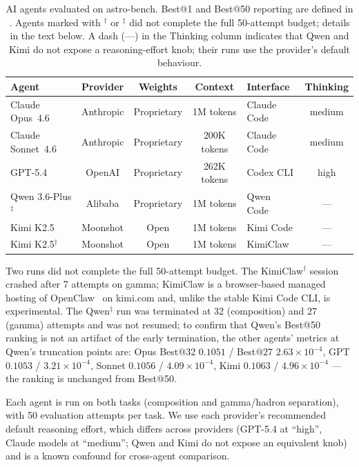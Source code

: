 \documentclass[universe,article,submit,pdftex,oneauthor]{Definitions/mdpi}
\begin{document}
\begin{table}[H]
\caption{AI agents evaluated on astro-bench. Best@1 and Best@50 reporting are defined in . Agents marked with $^\dagger$ or $^\ddagger$ did not complete the full 50-attempt budget; details in the text below. A dash (---) in the Thinking column indicates that Qwen and Kimi do not expose a reasoning-effort knob; their runs use the provider's default behaviour.\label{tab:agents}}
\begin{tabularx}{\textwidth}{lCCClC}
\toprule
\textbf{Agent} & \textbf{Provider} & \textbf{Weights} & \textbf{Context} & \textbf{Interface} & \textbf{Thinking} \\
\midrule
Claude Opus~4.6 & Anthropic & Proprietary & 1M tokens & Claude Code & medium \\
Claude Sonnet~4.6 & Anthropic & Proprietary & 200K tokens & Claude Code & medium \\
GPT-5.4 & OpenAI & Proprietary & 262K tokens & Codex CLI & high \\
Qwen 3.6-Plus$^\ddagger$ & Alibaba & Proprietary & 1M tokens & Qwen Code & --- \\
Kimi K2.5 & Moonshot & Open & 1M tokens & Kimi Code & --- \\
Kimi K2.5$^\dagger$ & Moonshot & Open & 1M tokens & KimiClaw & --- \\
\bottomrule
\end{tabularx}
\end{table}

Two runs did not complete the full 50-attempt budget. The KimiClaw$^\dagger$ session crashed after 7 attempts on gamma; KimiClaw is a browser-based managed hosting of OpenClaw~\cite{openclaw} on kimi.com and, unlike the stable Kimi Code CLI, is experimental. The Qwen$^\ddagger$ run was terminated at 32 (composition) and 27 (gamma) attempts and was not resumed; to confirm that Qwen's Best@50 ranking is not an artifact of the early termination, the other agents' metrics at Qwen's truncation points are: Opus Best@32 $0.1051$ / Best@27 $2.63 \times 10^{-4}$, GPT $0.1053$ / $3.21 \times 10^{-4}$, Sonnet $0.1056$ / $4.09 \times 10^{-4}$, Kimi $0.1063$ / $4.96 \times 10^{-4}$ --- the ranking is unchanged from Best@50.

Each agent is run on both tasks (composition and gamma/hadron separation), with 50 evaluation attempts per task. We use each provider's recommended default reasoning effort, which differs across providers (GPT-5.4 at ``high'', Claude models at ``medium''; Qwen and Kimi do not expose an equivalent knob) and is a known confound for cross-agent comparison.
\end{document}

